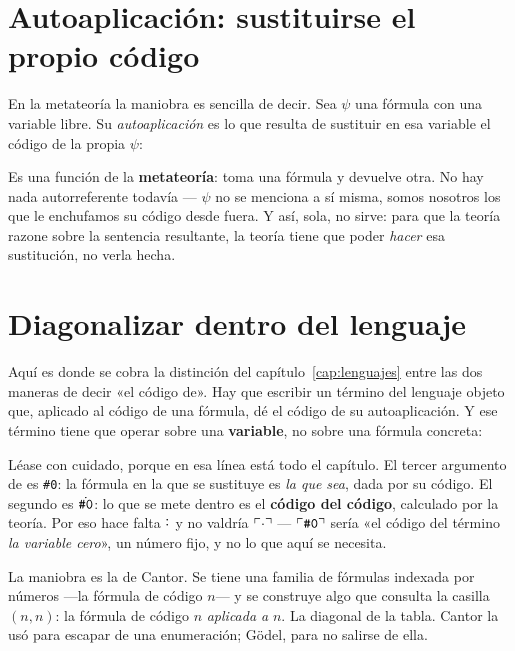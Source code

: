 \section{Autoaplicación: sustituirse el propio código}

En la metateoría la maniobra es sencilla de decir. Sea $\psi$ una fórmula con una variable libre.
Su \emph{autoaplicación} es lo que resulta de sustituir en esa variable el código de la propia
$\psi$:



Es una función de la \textbf{metateoría}: toma una fórmula y devuelve otra. No hay nada
autorreferente todavía — $\psi$ no se menciona a sí misma, somos nosotros los que le enchufamos su
código desde fuera. Y así, sola, no sirve: para que la teoría razone sobre la sentencia resultante,
la teoría tiene que poder \emph{hacer} esa sustitución, no verla hecha.

\section{Diagonalizar dentro del lenguaje}

Aquí es donde se cobra la distinción del capítulo~\ref{cap:lenguajes} entre las dos maneras de
decir «el código de». Hay que escribir un término del lenguaje objeto que, aplicado al código de
una fórmula, dé el código de su autoaplicación. Y ese término tiene que operar sobre una
\textbf{variable}, no sobre una fórmula concreta:



Léase con cuidado, porque en esa línea está todo el capítulo. El tercer argumento de
 es \texttt{\#0}: la fórmula en la que se sustituye es \emph{la que sea}, dada por su
código. El segundo es $\dot{\texttt{\#0}}$: lo que se mete dentro es el \textbf{código del
código}, calculado por la teoría. Por eso hace falta $\dot{\cdot}$ y no valdría $\ulcorner \cdot \urcorner$
— $\ulcorner \texttt{\#0} \urcorner$ sería «el código del término \emph{la variable cero}», un número fijo, y
no lo que aquí se necesita.

\begin{leccion}
La maniobra es la de Cantor. Se tiene una familia de fórmulas indexada por números —la fórmula de
código $n$— y se construye algo que consulta la casilla $(n,n)$: la fórmula de código $n$
\emph{aplicada a} $n$. La diagonal de la tabla. Cantor la usó para escapar de una enumeración;
Gödel, para no salirse de ella.
\end{leccion}

